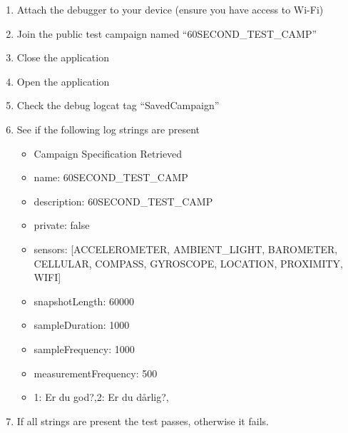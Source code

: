 \begin{enumerate}
    \item Attach the debugger to your device (ensure you have access to Wi-Fi)
    \item Join the public test campaign named ``60SECOND\_TEST\_CAMP''
    \item Close the application
    \item Open the application
    \item Check the debug logcat tag ``SavedCampaign''
    \item See if the following log strings are present
        \begin{itemize}
            \item Campaign Specification Retrieved
            \item name: 60SECOND\_TEST\_CAMP
            \item description: 60SECOND\_TEST\_CAMP
            \item private: false
            \item sensors: [ACCELEROMETER, AMBIENT\_LIGHT, BAROMETER, CELLULAR, COMPASS, GYROSCOPE, LOCATION, PROXIMITY, WIFI]
            \item snapshotLength: 60000
            \item sampleDuration: 1000
            \item sampleFrequency: 1000
            \item measurementFrequency: 500
            \item 1: Er du god?,2: Er du dårlig?,
        \end{itemize}
    \item If all strings are present the test passes, otherwise it fails.
\end{enumerate}